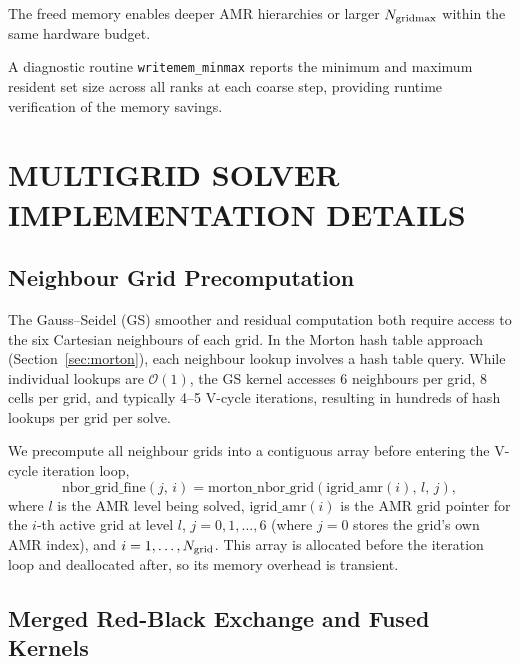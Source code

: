 \documentclass[fleqn,usenatbib]{mnras}
\newcommand{\ngridmax}{N_{\rm gridmax}}
\newcommand{\Olog}[1]{\mathcal{O}(#1)}
\newcommand{\code}[1]{\texttt{#1}}
\begin{document}
The freed memory enables deeper AMR hierarchies or larger $\ngridmax$
within the same hardware budget.

A diagnostic routine \code{writemem\_minmax} reports
the minimum and maximum resident set size across all ranks at each
coarse step, providing runtime verification of the memory savings.


\section{MULTIGRID SOLVER IMPLEMENTATION DETAILS}
\label{app:mg_details}

\subsection{Neighbour Grid Precomputation}
\label{app:mg_nbor_precompute}

The Gauss--Seidel (GS) smoother and residual computation both require
access to the six Cartesian neighbours of each grid. In the Morton
hash table approach (Section~\ref{sec:morton}), each neighbour lookup
involves a hash table query. While individual lookups are $\Olog{1}$,
the GS kernel accesses 6 neighbours per grid, 8 cells per grid, and
typically 4--5 V-cycle iterations, resulting in hundreds of hash
lookups per grid per solve.

We precompute all neighbour grids into a contiguous array before
entering the V-cycle iteration loop,
\begin{equation}
\text{nbor\_grid\_fine}(j,\, i) = \text{morton\_nbor\_grid}(
\text{igrid\_amr}(i),\, l,\, j),
\label{eq:nbor_precompute}
\end{equation}
where $l$ is the AMR level being solved, $\text{igrid\_amr}(i)$ is
the AMR grid pointer for the $i$-th active grid at level $l$,
$j = 0, 1, \ldots, 6$ (where $j = 0$ stores the grid's own AMR
index), and $i = 1, \ldots, N_{\rm grid}$. This
array is allocated before the iteration loop and deallocated after,
so its memory overhead is transient.


\subsection{Merged Red-Black Exchange and Fused Kernels}
\label{app:mg_merged_rb}
\end{document}

